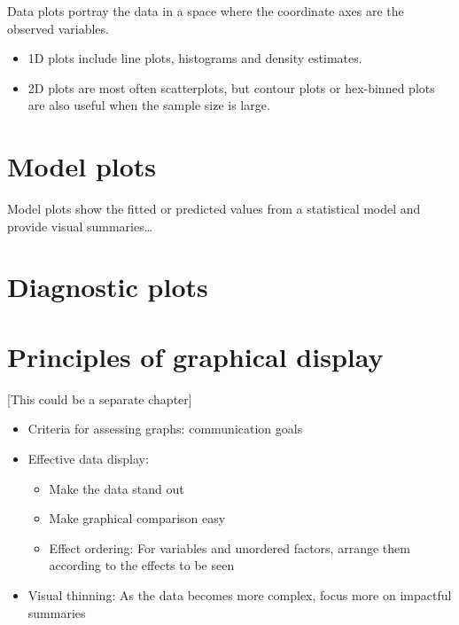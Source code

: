 \documentclass[
  letterpaper,
  10pt,
  krantz2]{krantz}
\providecommand{\tightlist}{%
  \setlength{\itemsep}{0pt}\setlength{\parskip}{0pt}}\usepackage{longtable,booktabs,array}
\begin{document}
Data plots portray the data in a space where the coordinate axes are the
observed variables.

\begin{itemize}
\tightlist
\item
  1D plots include line plots, histograms and density estimates.
\item
  2D plots are most often scatterplots, but contour plots or hex-binned
  plots are also useful when the sample size is large.
\end{itemize}

\hypertarget{model-plots}{%
\section{Model plots}\label{model-plots}}

Model plots show the fitted or predicted values from a statistical model
and provide visual summaries\ldots{}

\hypertarget{diagnostic-plots}{%
\section{Diagnostic plots}\label{diagnostic-plots}}

\hypertarget{principles-of-graphical-display}{%
\section{Principles of graphical
display}\label{principles-of-graphical-display}}

{[}This could be a separate chapter{]}

\begin{itemize}
\tightlist
\item
  Criteria for assessing graphs: communication goals
\item
  Effective data display:

  \begin{itemize}
  \tightlist
  \item
    Make the data stand out
  \item
    Make graphical comparison easy
  \item
    Effect ordering: For variables and unordered factors, arrange them
    according to the effects to be seen
  \end{itemize}
\item
  Visual thinning: As the data becomes more complex, focus more on
  impactful summaries
\end{itemize}
\end{document}
